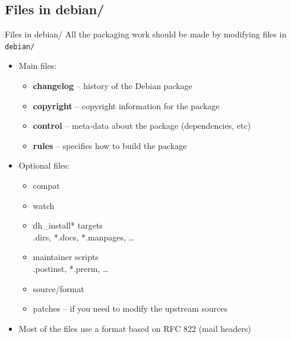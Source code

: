 \documentclass[10pt,final]{beamer}
\begin{document}
\subsection{Files in debian/}
\begin{frame}{Files in debian/}
  All the packaging work should be made by modifying files in \texttt{debian/}
  \hbr
  \begin{itemize}
  \item Main files:
    \begin{itemize}
    \item \textbf{changelog} -- history of the Debian package
    \item \textbf{copyright} -- copyright information for the package
    \item \textbf{control} -- meta-data about the package (dependencies, etc)
    \item \textbf{rules} -- specifies how to build the package
    \end{itemize}
    \hbr
  \item Optional files:
    \begin{itemize}
    \item compat
    \item watch
    \item dh\_install* targets\\
      {\small *.dirs, *.docs, *.manpages, \ldots}
    \item maintainer scripts\\
      {\small *.postinst, *.prerm, \ldots}
    \item source/format
    \item patches -- if you need to modify the upstream sources
    \end{itemize}
    \hbr
  \item Most of the files use a format based on RFC 822 (mail headers)
  \end{itemize}
\end{frame}
\end{document}
